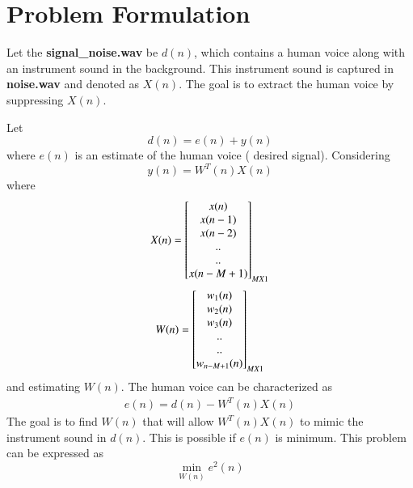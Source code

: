 \documentclass[journal,12pt,twocolumn]{IEEEtran}
\begin{document}
\section{Problem Formulation}
Let the \textbf{signal\_noise.wav} be $d(n)$, which contains a human voice along 
with an instrument sound in the background.  This instrument sound
is captured in \textbf{noise.wav} and denoted as $X(n)$. The goal is to 
extract the human voice by suppressing $X(n)$. 
%

Let
\begin{equation}
d(n) = e(n) + y(n)
\end{equation}
where $e(n)$ is an estimate of the human voice ( desired signal). 
Considering
\begin{equation}
y(n) = W^{T}(n)X(n)
\end{equation}
where
\begin{align}
 X(n)
 =
  \begin{bmatrix}
   x(n) \\ x(n-1)\\
   x(n-2) \\ $..$ \\ $..$ \\ x(n-M+1)  \end{bmatrix}_{M X 1}
\end{align}
\begin{align}
 W(n)
 =
  \begin{bmatrix}
   w_1(n) \\ w_2(n)\\
   w_3(n) \\ $..$ \\ $..$ \\ w_{n-M+1}(n)  \end{bmatrix}_{M X 1}
\end{align}
and estimating $W(n)$.
The human voice can be characterized as
%
\begin{align}
\label{eq:error}
e(n) = d(n)-W^{T}(n)X(n)
\end{align}
%
The goal is to find $W(n)$ that will allow $W^{T}(n)X(n)$ to mimic the instrument sound in $d(n)$.
This is possible if $e(n)$ is minimum. This problem can be expressed as
\begin{equation}
\label{eq:prob_mse}
\min_{W(n)}e^{2}(n)
\end{equation}
%
\end{document}
